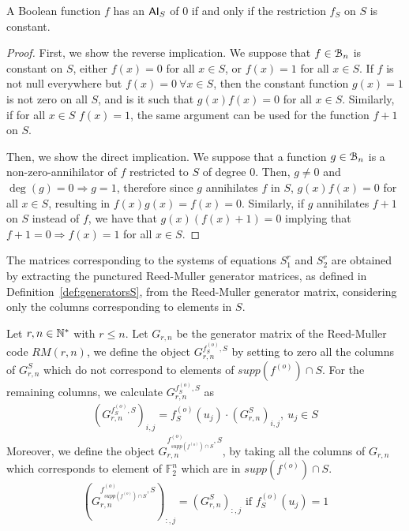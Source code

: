 \documentclass[11pt]{llncs}
\begin{document}
\begin{proposition}\label{prop:constantFs}
	A Boolean function $f$ has an $\mathsf{AI}_S$ of $0$ if and only if the restriction $f_S$ on $S$ is constant.
\end{proposition}

\begin{proof}
	First, we show the reverse implication.
	We suppose that $f\in \mathcal{B}_n$ is constant on $S$, either $f(x) = 0$ for all $x\in S$, or $f(x) = 1$ for all $x\in S$.
	If $f$ is not null everywhere but $f(x) = 0\ \forall x \in  S$, then the constant function $g(x) = 1$ is not zero on all $S$, and is it such that $g(x)f(x) = 0$ for all $x\in S$. 
	Similarly, if for all $x\in S$ $f(x) = 1$, the same argument can be used for the function $f+ 1$ on $S$.
	
	Then, we show the direct implication.
	We suppose that a function $g\in \mathcal{B}_n$ is a non-zero-annihilator of $f$ restricted to $S$ of degree $0$. Then,
	$g \neq 0$ and $\deg(g) = 0 \Rightarrow g = 1$, therefore since $g$ annihilates $f$ in $S$,  $g(x) f(x) = 0$ for all $x \in S$, resulting in $f(x)g(x) = f(x) = 0$.
	Similarly, if $g$ annihilates $f+ 1$ on $S$ instead of $f$, we have that $g(x)(f(x) + 1) = 0$ implying that $f+ 1 = 0 \Rightarrow f(x) = 1$ for all $x\in S$. 
\end{proof}

The matrices corresponding to the systems of equations $S_1^r$ and $S_2^r$ are obtained by extracting the punctured Reed-Muller generator matrices, as defined in Definition~\ref{def:generatorsS}, from the Reed-Muller generator matrix, considering only the columns corresponding to elements in $S$.




\begin{definition}\label{def:generatorsS}
Let $r,n\in\mathbb{N}^*$ with $r\leq n$. Let $G_{r,n}$ be the generator matrix of the Reed-Muller code $RM(r,n)$, we define the object $G_{r,n}^{f^{(o)}_S,S}$ by setting to zero all the columns of $G_{r,n}^S$ which do not correspond to elements of $supp(f^{(o)} )\cap S$. For the remaining columns, we calculate $G_{r,n}^{f_S^{(o)},S}$ as
	\begin{align*}
	\left(G_{r,n}^{f^{(o)}_S,S}\right)_{i,j} = f_S^{(o)}(u_j) \cdot \left(G_{r,n}^S\right)_{i,j}, \ u_j \in S
	\end{align*}
	Moreover, we define the object $G_{r,n}^{f^{(o)}_{supp\left(f^{(o)}\right) \cap S},S}$, by taking all the columns of $G_{r,n}$ which corresponds to element of $\mathbb{F}_2^n$ which are in $supp\left(f^{(o)}\right) \cap S$.
	\begin{align}
	\left(G_{r,n}^{f_{supp\left(f^{(o)}\right) \cap S}^{(o)},S}\right)_{:,j} = (G_{r,n}^S)_{:,j} \mbox{ if } f_S^{(o)}(u_j) = 1 \label{eq:f-generatorRestrictedSet}
	\end{align}
\end{definition}
\end{document}
